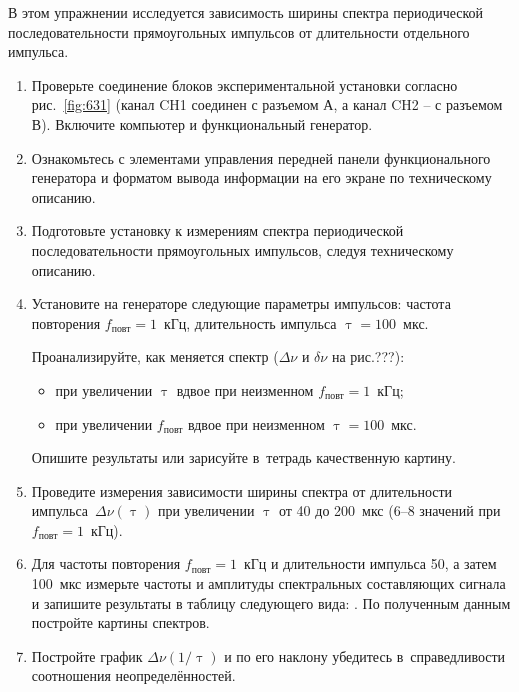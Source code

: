 \begin{lab:task}

В этом упражнении исследуется зависимость ширины спектра периодической последовательности прямоугольных импульсов от длительности отдельного импульса.

\begin{enumerate}
	\item Проверьте соединение блоков экспериментальной установки согласно рис.~\ref{fig:631}
 (канал CH1 соединен с разъемом А, а канал CH2 – с разъемом В). Включите компьютер и функциональный генератор.
	\item Ознакомьтесь с элементами управления передней панели функционального генератора и форматом вывода информации на его экране по техническому описанию.
	\item Подготовьте установку к измерениям спектра периодической последовательности прямоугольных импульсов, следуя техническому описанию.
	\item Установите на генераторе следующие параметры импульсов: частота повторения $f_\text{повт}=1$~кГц, длительность импульса $\uptau=100$~мкс.

	Проанализируйте, как меняется спектр ($\Delta\nu$ и $\delta\nu$ на рис.???):
	\begin{itemize}
		\item при увеличении $\uptau$ вдвое при неизменном $f_{\text{повт}}=1$~кГц;
		\item  при увеличении $f_\text{повт}$ вдвое при неизменном $\uptau=100$~мкс.
	\end{itemize}
	
	Опишите результаты или зарисуйте в~тетрадь качественную картину.
	
%
	\item Проведите измерения зависимости ширины спектра от длительности импульса~$\Delta \nu(\uptau)$ при увеличении $\uptau$ от 40 до 200~мкс (6--8 значений при $f_\text{повт}=1$~кГц).
	\item Для частоты повторения $f_\text{повт} = 1$~кГц и длительности импульса 50, а затем 100~мкс измерьте частоты и амплитуды спектральных составляющих сигнала и запишите результаты в таблицу следующего вида: . По полученным данным постройте картины спектров.
	\item Постройте график $\Delta \nu(1/\uptau)$ и по его наклону убедитесь в~справедливости соотношения неопределённостей.
\end{enumerate}


\end{lab:task}
